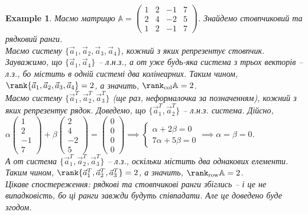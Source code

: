 \documentclass[a4paper, 10pt]{article}
\theoremstyle{theoremdd}
\newtheorem{example}[theorem]{Example}
\begin{document}
\begin{example}
Маємо матрицю $\mathbb{A} = \begin{pmatrix}
1 & 2 & -1 & 7 \\
2 & 4 & -2 & 5 \\
1 & 2 & -1 & 7
\end{pmatrix}$. Знайдемо стовпчиковий та рядковий ранги.\\
Маємо систему $\{\vec{a}_1,\vec{a}_2,\vec{a}_3,\vec{a}_4 \}$, кожний з яких репрезентує стовпчик. Зауважимо, що $\{\vec{a}_1, \vec{a}_4 \}$ -- л.н.з., а от уже будь-яка система з трьох векторів -- л.з., бо містить в одній системі два колінеарних. Таким чином, $\rank \{\vec{a}_1,\vec{a}_2,\vec{a}_3,\vec{a}_4\} = 2$, а значить, $\rank_{\text{col}} \mathbb{A} = 2$.\\
Маємо систему $\{\vec{a}_1^T,\vec{a}_2^T,\vec{a}_3^T \}$ (ще раз, неформалочка за позначенням), кожний з яких репрезентує рядок. Доведемо, що $\{\vec{a}_1^T,\vec{a}_2^T \}$ -- л.н.з. система. Дійсно,\\
$\alpha\begin{pmatrix}
1 \\ 2 \\ -1 \\ 7
\end{pmatrix} + \beta \begin{pmatrix}
2 \\ 4 \\ -2 \\ 5
\end{pmatrix} = \begin{pmatrix}
0 \\ 0 \\ 0 \\ 0
\end{pmatrix} \implies \begin{cases} \alpha + 2\beta = 0 \\ 7\alpha + 5\beta = 0 \end{cases} \implies \alpha=\beta = 0$.\\
А от система $\{\vec{a}_1^T,\vec{a}_2^T,\vec{a}_3^T \}$ -- л.з., оскільки містить два однакових елементи. \\
Таким чином, $\rank\{\vec{a}_1^T,\vec{a}_2^T,\vec{a}_3^T \} = 2$, а значить, $\rank_{\text{row}} \mathbb{A} = 2$.\\
Цікаве спостереження: рядкові та стовпчикові ранги збіглись -- і це не випадковість, бо ці ранги завжди будуть співпадати. Але це доведено буде згодом.
\end{example}
\end{document}
